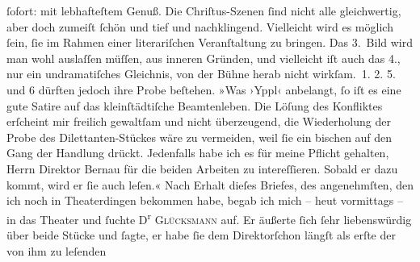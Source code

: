 \begin{ledgroupsized}[t]{13cm}
               ſofort: mit lebhafteſtem Genuß. Die Chriſtus-Szenen ſind nicht alle gleichwertig, aber doch zumeiſt ſchön und tief
               und nachklingend. Vielleicht wird es möglich ſein, ſie im Rahmen einer {\pb}literariſchen Veranſtaltung zu bringen.
               Das 3. Bild wird man wohl auslaſſen müſſen, aus inneren Gründen, und vielleicht iſt
               auch das 4., nur ein undramatiſches Gleichnis, von der Bühne herab nicht
                  wirkſam. 1.{ }2.{ }5. und 6 dürften jedoch ihre Probe beſtehen.\pend
           \pstart
           »Was ›Yppl‹ anbelangt, ſo iſt es eine gute
               Satire auf das kleinſtädtiſche Beamtenleben. Die Löſung des Konfliktes erſcheint mir
               freilich gewaltſam und nicht überzeugend, die Wiederholung der Probe des
               Dilettanten-Stückes wäre zu vermeiden, weil ſie ein bischen auf den Gang der Handlung
               drückt. Jedenfalls habe ich es für meine Pflicht gehalten, Herrn Direktor Bernau für die beiden Arbeiten zu intereſſieren.
               Sobald er dazu kommt, wird er ſie auch leſen.«\pend
           \pstart
           Nach Erhalt dieſes Briefes, des angenehmſten, den ich noch in Theaterdingen bekommen
               habe, begab ich mich – heut vormittags – in das Theater und ſuchte D\textsuperscript{r}{ }\textsc{Glücksmann} auf. Er äußerte ſich ſehr liebenswürdig {\pb}über beide Stücke und ſagte, er habe ſie dem
                  Direktorſchon längſt als erſte der von ihm zu leſenden

\end{ledgroupsized}
